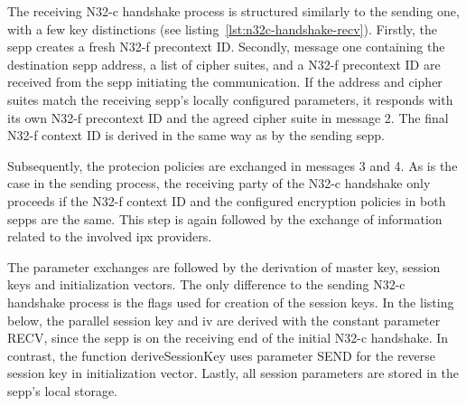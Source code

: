 The receiving N32-c handshake process is structured similarly to the sending one, with a few key distinctions (see listing~\ref{lst:n32c-handshake-recv}).
Firstly, the \gls{sepp} creates a fresh N32-f precontext ID.
Secondly, message one containing the destination \gls{sepp} address, a list of cipher suites, and a N32-f precontext ID are received from the \gls{sepp} initiating the communication.
If the address and cipher suites match the receiving \gls{sepp}'s locally configured parameters, it responds with its own N32-f precontext ID and the agreed cipher suite in message 2.
The final N32-f context ID is derived in the same way as by the sending \gls{sepp}.

Subsequently, the protecion policies are exchanged in messages 3 and 4.
As is the case in the sending process, the receiving party of the N32-c handshake only proceeds if the N32-f context ID and the configured encryption policies in both \glspl{sepp} are the same.
This step is again followed by the exchange of information related to the involved \gls{ipx} providers.

The parameter exchanges are followed by the derivation of master key, session keys and initialization vectors.
The only difference to the sending N32-c handshake process is the flags used for creation of the session keys.
In the listing below, the parallel session key and \gls{iv} are derived with the constant parameter {\sffamily RECV}, since the \gls{sepp} is on the receiving end of the initial N32-c handshake.
In contrast, the function {\sffamily deriveSessionKey} uses parameter {\sffamily SEND} for the reverse session key in initialization vector.
Lastly, all session parameters are stored in the \gls{sepp}'s local storage.

